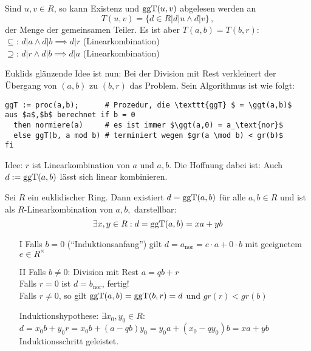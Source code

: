 \documentclass[a4paper,DIV15,BCOR12mm]{article}
\begin{document}
\begin{beweis}
Sind $u,v \in R$, so kann Existenz und $\mathop{\rm ggT}\nolimits(u,v)$ abgelesen werden
an
\[ T(u,v) = \{d\in R \big| d|u \wedge d|v \}\,,\]
der Menge der gemeinsamen Teiler. Es ist aber $T(a,b) = T(b,r)$:\\
\glqq$\subseteq$\grqq: $d|a \wedge d|b \implies d|r$ (Linearkombination)\\
\glqq$\supseteq$\grqq: $d|r \wedge d|b \implies d|a$
(Linearkombination)
\end{beweis}

Euklids glänzende Idee ist nun: Bei der Division mit Rest
verkleinert der Übergang von $(a,b)$ zu $(b,r)$ das Problem. Sein
Algorithmus ist wie folgt:

\begin{lstlisting}
ggT := proc(a,b);      # Prozedur, die \texttt{ggT} $ = \ggt(a,b)$
aus $a$,$b$ berechnet if b = 0
  then normiere(a)     # es ist immer $\ggt(a,0) = a_\text{nor}$
  else ggT(b, a mod b) # terminiert wegen $gr(a \mod b) < gr(b)$
fi
\end{lstlisting}

Idee: $r$ ist Linearkombination von $a$ und $a,b$. Die Hoffnung
dabei ist: Auch $d:= \mathop{\rm ggT}\nolimits(a,b)$ lässt sich linear kombinieren.

\begin{satz}\label{satz:LinKom}
Sei $R$ ein euklidischer Ring. Dann existiert $d=\mathop{\rm ggT}\nolimits(a,b)$ für alle
$a,b\in R$ und ist als $R$-Linearkombination von $a,b,$ darstellbar:
\[ \exists x,y\in R: d= \mathop{\rm ggT}\nolimits(a,b) = xa + yb \]
\end{satz}

\begin{beweis}
\begin{itemize}
\item[I] Falls $b=0$ ("`Induktionsanfang"') gilt $d= a_\text{nor}= e\cdot a + 0 \cdot b$ mit geeignetem $e\in R^\times$
\item[II] Falls $b\ne 0$: Division mit Rest $a  = qb + r$ \\
Falls $r=0$ ist $d=b_\text{nor}$, fertig!\\
Falls $r\ne0$, so gilt $\mathop{\rm ggT}\nolimits(a,b) = \mathop{\rm ggT}\nolimits(b,r) = d$ und $gr(r)<gr(b)$

Induktionshypothese: $\exists x_0,y_0\in R$: $d=x_0b + y_0 r = x_0 b + (a-qb)y_0  = y_0 a + (x_0-qy_0)b = xa+yb$\\
Induktionsschritt geleistet.
\end{itemize}
\end{beweis}
\end{document}
